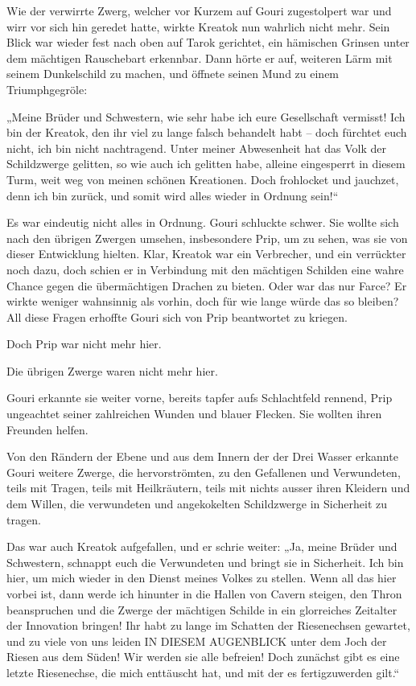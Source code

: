 \documentclass[10pt, a4paper, oneside]{book}
\begin{document}
Wie der verwirrte Zwerg, welcher vor Kurzem auf Gouri zugestolpert war und wirr vor sich hin geredet hatte, wirkte Kreatok nun wahrlich nicht mehr. Sein Blick war wieder fest nach oben auf Tarok gerichtet, ein hämischen Grinsen unter dem mächtigen Rauschebart erkennbar. Dann hörte er auf, weiteren Lärm mit seinem Dunkelschild zu machen, und öffnete seinen Mund zu einem Triumphgegröle:

„Meine Brüder und Schwestern, wie sehr habe ich eure Gesellschaft vermisst! Ich bin der Kreatok, den ihr viel zu lange falsch behandelt habt – doch fürchtet euch nicht, ich bin nicht nachtragend. Unter meiner Abwesenheit hat das Volk der Schildzwerge gelitten, so wie auch ich gelitten habe, alleine eingesperrt in diesem Turm, weit weg von meinen schönen Kreationen. Doch frohlocket und jauchzet, denn ich bin zurück, und somit wird alles wieder in Ordnung sein!“

Es war eindeutig nicht alles in Ordnung. Gouri schluckte schwer. Sie wollte sich nach den übrigen Zwergen umsehen, insbesondere Prip, um zu sehen, was sie von dieser Entwicklung hielten. Klar, Kreatok war ein Verbrecher, und ein verrückter noch dazu, doch schien er in Verbindung mit den mächtigen Schilden eine wahre Chance gegen die übermächtigen Drachen zu bieten. Oder war das nur Farce? Er wirkte weniger wahnsinnig als vorhin, doch für wie lange würde das so bleiben? All diese Fragen erhoffte Gouri sich von Prip beantwortet zu kriegen.

Doch Prip war nicht mehr hier.

Die übrigen Zwerge waren nicht mehr hier.

Gouri erkannte sie weiter vorne, bereits tapfer aufs Schlachtfeld rennend, Prip ungeachtet seiner zahlreichen Wunden und blauer Flecken. Sie wollten ihren Freunden helfen.

Von den Rändern der Ebene und aus dem Innern der der Drei Wasser erkannte Gouri weitere Zwerge, die hervorströmten, zu den Gefallenen und Verwundeten, teils mit Tragen, teils mit Heilkräutern, teils mit nichts ausser ihren Kleidern und dem Willen, die verwundeten und angekokelten Schildzwerge in Sicherheit zu tragen.

Das war auch Kreatok aufgefallen, und er schrie weiter: „Ja, meine Brüder und Schwestern, schnappt euch die Verwundeten und bringt sie in Sicherheit. Ich bin hier, um mich wieder in den Dienst meines Volkes zu stellen. Wenn all das hier vorbei ist, dann werde ich hinunter in die Hallen von Cavern steigen, den Thron beanspruchen und die Zwerge der mächtigen Schilde in ein glorreiches Zeitalter der Innovation bringen! Ihr habt zu lange im Schatten der Riesenechsen gewartet, und zu viele von uns leiden IN DIESEM AUGENBLICK unter dem Joch der Riesen aus dem Süden! Wir werden sie alle befreien! Doch zunächst gibt es eine letzte Riesenechse, die mich enttäuscht hat, und mit der es fertigzuwerden gilt.“
\end{document}
